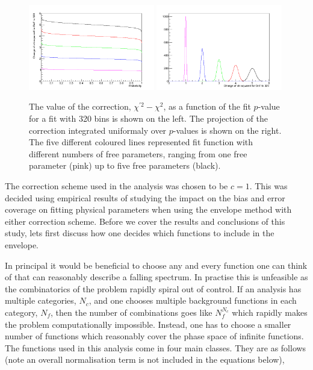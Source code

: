 \begin{figure}
  \begin{center}
    \includegraphics[width=0.49\textwidth]{ch5_anal_and_results/plots/ChisqConv1.png}
    \includegraphics[width=0.49\textwidth]{ch5_anal_and_results/plots/ChisqConv2.png}
    \caption{The value of the correction, $\chi^{\prime 2} - \chi^{2}$, as a function of the fit $p$-value for a fit with 320 bins is shown on the left. The projection of the correction integrated uniformaly over $p$-values is shown on the right. The five different coloured lines represented fit function with different numbers of free parameters, ranging from one free parameter (pink) up to five free parameters (black).}
    \label{fig:envelope_chi2_correction}
  \end{center}
\end{figure}

The correction scheme used in the analysis was chosen to be $c=1$. This was decided using empirical results of studying the impact on the bias and error coverage on fitting physical parameters when using the envelope method with either correction scheme. Before we cover the results and conclusions of this study, lets first discuss how one decides which functions to include in the envelope.

In principal it would be beneficial to choose any and every function one can think of that can reasonably describe a falling spectrum. In practise this is unfeasible as the combinatorics of the problem rapidly spiral out of control. If an analysis has multiple categories, $N_{c}$, and one chooses multiple background functions in each category, $N_{f}$, then the number of combinations goes like $N_{f}^{N_{c}}$ which rapidly makes the problem computationally impossible. Instead, one has to choose a smaller number of functions which reasonably cover the phase space of infinite functions. The functions used in this analysis come in four main classes. They are as follows (note an overall normalisation term is not included in the equations below),

